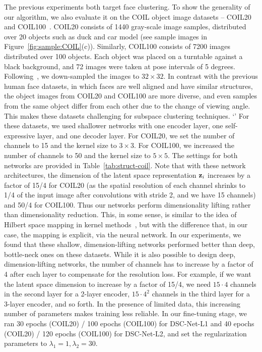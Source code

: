 \documentclass{article}
\begin{document}
The previous experiments both target face clustering. To show the generality of our algorithm, we also evaluate it on the COIL object image datasets -- COIL20~\cite{coil20} and COIL100~\cite{coil100}. COIL20 consists of 1440 gray-scale image samples, distributed over 20 objects such as duck and car model (see sample images in Figure~\ref{fig:sample:COIL}(c)). Similarly, COIL100 consists of 7200 images distributed over 100 objects. Each object was placed on a turntable against a black background, and 72 images were taken at pose intervals of 5 degrees. Following~\cite{cai2011graph}, we down-sampled the images to $32\times 32$. In contrast with the previous human face datasets, in which faces are well aligned and have similar structures, the object images from COIL20 and COIL100 are more diverse, and even samples from the same object differ from each other due to the change of viewing angle. This makes these datasets challenging for subspace clustering techniques.
`'
For these datasets, we used shallower networks with one encoder layer, one self-expressive layer, and one decoder layer. For COIL20, we set the number of channels to 15 and the kernel size to $3\times 3$. For COIL100, we increased the number of channels to 50 and the kernel size to $5\times 5$. The settings for both networks are provided in Table~\ref{tab:struct-coil}. Note that with these network architectures, the dimension of the latent space representation ${\bf z}_i$ increases by a factor of 15/4 for COIL20 (as the spatial resolution of each channel shrinks to 1/4 of the input image after convolutions with stride 2, and we have 15 channels) and 50/4 for COIL100. Thus our networks perform dimensionality lifting rather than dimensionality reduction. This, in some sense, is similar to the idea of Hilbert space mapping in kernel methods~\cite{shawe2004kernel}, but with the difference that, in our case, the mapping is explicit, via the neural network. In our experiments, we found that these shallow, dimension-lifting networks performed better than deep, bottle-neck ones on these datasets. While it is also possible to design deep, dimension-lifting networks, the number of channels has to increase by a factor of 4 after each layer to compensate for the resolution loss. For example, if we want the latent space dimension to increase by a factor of 15/4, we need $15 \cdot 4$ channels in the second layer for a 2-layer encoder, $15 \cdot 4^2$ channels in the third layer for a 3-layer encoder, and so forth. In the presence of limited data, this increasing number of parameters makes training less reliable. In our fine-tuning stage, we ran 30 epochs (COIL20) / 100 epochs (COIL100) for DSC-Net-L1 and 40 epochs (COIL20) / 120 epochs (COIL100) for DSC-Net-L2, and set the regularization parameters to $\lambda_1 = 1, \lambda_2 = 30$. 
\end{document}

